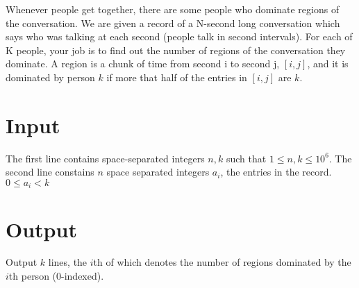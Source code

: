 
Whenever people get together, there are some people who dominate regions of the conversation. We are given a record of a N-second long conversation which says who was talking at each second (people talk in second intervals). For each of K people, your job is to find out the number of regions of the conversation they dominate. A region is a chunk of time from second i to second j, $[i,j]$, and it is dominated by person $k$ if more that half of the entries in $[i,j]$ are $k$.

\section*{Input}
The first line contains space-separated integers $n,k$ such that $1 \leq n,k \leq 10^6$.
The second line constains $n$ space separated integers $a_i$, the entries in the record. $0 \leq a_i < k$

\section*{Output}
Output $k$ lines, the $i$th of which denotes the number of regions dominated by the $i$th person ($0$-indexed).
